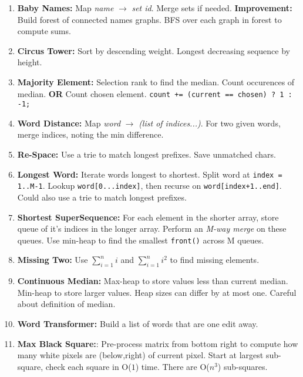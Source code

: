 \documentclass[12pt]{article}
\newcommand{\OONE}{O($1$) }
\newcommand{\ONCB}{O($n^3$) }
\begin{document}
\begin{enumerate}
\begin{enumerate}[label*=\arabic*.]
\item \textbf{Baby Names:} Map \emph{name} $\rightarrow$ \emph{set id}. Merge sets if needed. \textbf{Improvement:} Build forest of connected names graphs. BFS over each graph in forest to compute sums.
\item \textbf{Circus Tower:} Sort by descending weight. Longest decreasing sequence by height.
\item \textbf{Majority Element:} Selection rank to find the median. Count occurences of median.
\textbf{OR} Count chosen element. \texttt{count += (current == chosen) ? 1 : -1;}
\item \textbf{Word Distance:} Map \emph{word} $\rightarrow$ \emph{(list of indices...)}. 
For two given words, merge indices, noting the min difference.
\item \textbf{Re-Space:} Use a trie to match longest prefixes. Save unmatched chars.
\item \textbf{Longest Word:} Iterate words longest to shortest.
Split word at \texttt{index = 1..M-1}. 
Lookup \texttt{word[0...index]}, then recurse on \texttt{word[index+1..end]}.
Could also use a trie to match longest prefixes.
\item \textbf{Shortest SuperSequence:} For each element in the shorter array, 
store queue of it's indices in the longer array. Perform an \emph{M-way merge} on these queues. 
Use min-heap to find the smallest \texttt{front()} across M queues.
\item \textbf{Missing Two:} Use $\sum\limits_{i=1}^n i$ and $\sum\limits_{i=1}^n i^2$ to find missing elements.
\item \textbf{Continuous Median:} Max-heap to store values less than current median. Min-heap to store larger values. Heap sizes can differ by at most one. Careful about definition of median.
\item \textbf{Word Transformer:} Build a list of words that are one edit away.
\item \textbf{Max Black Square:}: Pre-process matrix from bottom right to compute 
how many white pixels are (below,right) of current pixel. 
Start at largest sub-square, check each square in \OONE time. There are \ONCB sub-squares.
\end{enumerate}
\end{enumerate}
\end{document}
